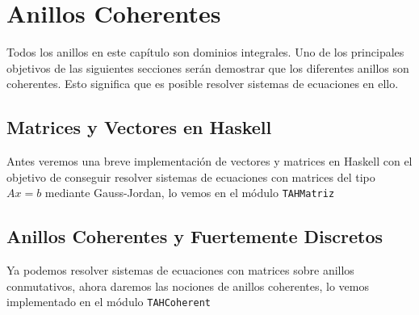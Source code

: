 \chapter{Anillos Coherentes}\label{sec:coherentHas}
Todos los anillos en este capítulo son dominios integrales. Uno de los principales objetivos de las siguientes secciones serán demostrar que los diferentes anillos son coherentes. Esto significa que es posible resolver sistemas de ecuaciones en ello.
\section{Matrices y Vectores en Haskell}
Antes veremos una breve implementación de vectores y matrices en Haskell con el objetivo de conseguir resolver sistemas de ecuaciones con matrices del tipo $Ax=b$ mediante Gauss-Jordan, lo vemos en el módulo \texttt{TAHMatriz} 

\section{Anillos Coherentes y Fuertemente Discretos}
Ya podemos resolver sistemas de ecuaciones con matrices sobre anillos conmutativos, ahora daremos las nociones de anillos coherentes, lo vemos implementado en el módulo \texttt{TAHCoherent}

